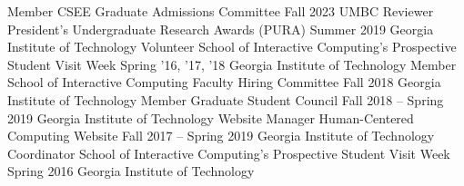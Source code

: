 {\color{black}\fontsize{12pt}{1em}} 

\begin{cventries}
\cventry
    {Member}
    {CSEE Graduate Admissions Committee}
    {Fall 2023}
    {UMBC}
    {}    
\cventry
    {Reviewer}
    {President's Undergraduate Research Awards (PURA)}
    {Summer 2019}
    {Georgia Institute of Technology}
    {}    
\cventry
    {Volunteer}
    {School of Interactive Computing’s Prospective Student Visit Week}
    {Spring '16, '17, '18}
    {Georgia Institute of Technology}
    {}
\cventry
    {Member}
    {School of Interactive Computing Faculty Hiring Committee}
    {Fall 2018}
    {Georgia Institute of Technology}
    {}
\cventry
    {Member}
    {Graduate Student Council}
    {Fall 2018 -- Spring 2019}
    {Georgia Institute of Technology}
    {}    
\cventry
    {Website Manager}
    {Human-Centered Computing Website}
    {Fall 2017 -- Spring 2019}
    {Georgia Institute of Technology}
    {}    
\cventry
    {Coordinator}
    {School of Interactive Computing's Prospective Student Visit Week}
    {Spring 2016}
    {Georgia Institute of Technology}
    {}
\end{cventries}


